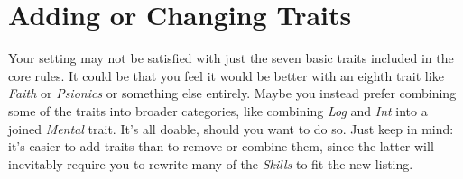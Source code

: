 \section{Adding or Changing Traits}
Your setting may not be satisfied with just the seven basic traits included in the core rules.
It could be that you feel it would be better with an eighth trait like \textit{Faith} or \textit{Psionics} or something else entirely.
Maybe you instead prefer combining some of the traits into broader categories, like combining \textit{Log} and \textit{Int} into a joined \textit{Mental} trait.
It's all doable, should you want to do so.
Just keep in mind: it's easier to add traits than to remove or combine them, since the latter will inevitably require you to rewrite many of the \textit{Skills} to fit the new listing.